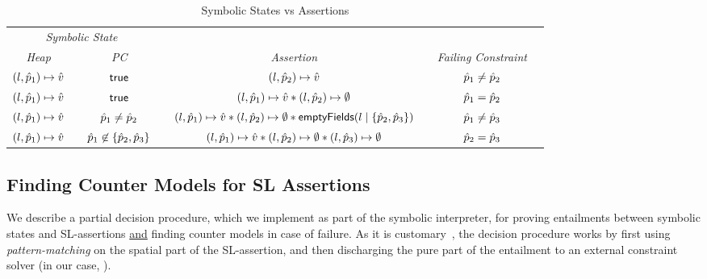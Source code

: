 \begin{table}
\centering
\renewcommand{\arraystretch}{1.2} 
{\scriptsize \begin{tabular}{@{}cccccccc@{}}\toprule
\multicolumn{3}{c}{{\it Symbolic State}} & &  & & & \\
\cmidrule{1-3}%
\emph{Heap}  &  & \emph{PC}  &   &  \emph{Assertion}  & & \emph{Failing Constraint}       \\
\cmidrule{1-1} \cmidrule{3-3} \cmidrule{5-5}  \cmidrule{7-7}
%
$(l, \hat{p}_1) \mapsto \hat{v}$ & & ${\sf true}$ & & 
	$(l, \hat{p}_2) \mapsto \hat{v}$ & &  $\hat{p}_1 \neq \hat{p}_2$ \\    
%
$(l, \hat{p}_1) \mapsto \hat{v}$ & & ${\sf true}$ & & 
	$(l, \hat{p}_1) \mapsto \hat{v} \mathbin{*} (l, \hat{p}_2) \mapsto \emptyset$ & &  $\hat{p}_1 = \hat{p}_2$ \\    
%
$(l, \hat{p}_1) \mapsto \hat{v}$ & & $\hat{p}_1 \neq \hat{p}_2$ & & 
	$(l, \hat{p}_1) \mapsto \hat{v} \mathbin{*} (l, \hat{p}_2) \mapsto \emptyset \mathbin{*} \mathsf{emptyFields}(l \mid \{\hat{p}_2, \hat{p}_3\})$ & &  $\hat{p}_1 \neq \hat{p}_3$ \\    
%
$(l, \hat{p}_1) \mapsto \hat{v}$ & & $\hat{p}_1 \not\in \{\hat{p}_2, \hat{p}_3\}$ & & 
	$(l, \hat{p}_1) \mapsto \hat{v} \mathbin{*} (l, \hat{p}_2) \mapsto \emptyset \mathbin{*} (l, \hat{p}_3) \mapsto \emptyset$ & &  $\hat{p}_2 = \hat{p}_3$ \\    

\bottomrule
\end{tabular}}
\vspace{2pt}
\caption{Symbolic States vs Assertions\label{example:symb:states:vs:assertions}}
\vspace*{-0.7cm}
\end{table}

\subsection{Finding Counter Models for SL Assertions}
\label{subsec:countermodels}

We describe a partial decision procedure, which we  
implement as part of the \jsil symbolic interpreter, for proving entailments 
between symbolic states and SL-assertions \underline{and} finding counter 
models in case of failure.  
As it is customary~\cite{javert,jacobs2011verifast,sepwithsmt}, the decision procedure works by first using \emph{pattern-matching} 
on the spatial part of the SL-assertion, and then discharging the pure part of the 
entailment to an external constraint solver (in our case, \rosette). 

